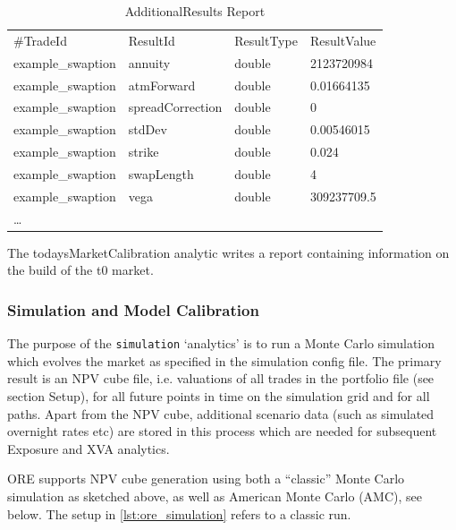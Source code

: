 \begin{table}[hbt]
\scriptsize
\begin{center}
  \begin{tabular}{l|l|l|l}
\hline
\#TradeId & ResultId & ResultType & ResultValue \\
example\_swaption & annuity & double & 2123720984 \\
example\_swaption & atmForward & double & 0.01664135 \\
example\_swaption & spreadCorrection & double & 0 \\
example\_swaption & stdDev & double & 0.00546015 \\
example\_swaption & strike & double & 0.024 \\
example\_swaption & swapLength & double & 4 \\
example\_swaption & vega & double & 309237709.5 \\
\hline
\hline
\ldots
\end{tabular}
\caption{AdditionalResults Report}
\label{additionalreport}
\end{center}
\end{table}

The todaysMarketCalibration analytic writes a report containing information on the build of the t0 market.

\subsubsection{Simulation and Model Calibration}

The purpose of the {\tt simulation} `analytics' is to run a Monte Carlo simulation which evolves the market as
specified in the simulation config file. The primary result is an NPV cube file, i.e. valuations of all trades in the
portfolio file (see section Setup), for all future points in time on the simulation grid and for all paths. Apart from
the NPV cube, additional scenario data (such as simulated overnight rates etc) are stored in this process which are
needed for subsequent Exposure and XVA analytics.

ORE supports NPV cube generation using both a ``classic'' Monte Carlo simulation as sketched above,
as well as American Monte Carlo (AMC), see below. The setup in \ref{lst:ore_simulation} refers to a classic run.

